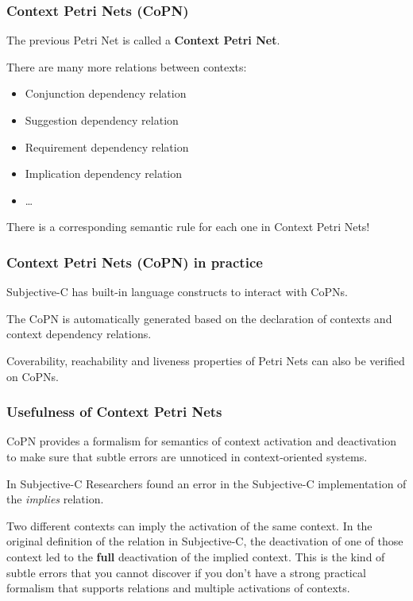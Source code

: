 \documentclass{beamer}
\begin{document}












\begin{frame}
	\frametitle{Context Petri Nets (CoPN)}

	The previous Petri Net is called a \textbf{Context Petri Net}.
	\bigskip

	There are many more relations between contexts:

	\begin{itemize}
		\item Conjunction dependency relation
		\item Suggestion dependency relation
		\item Requirement dependency relation
		\item Implication dependency relation
		\item \ldots
	\end{itemize}

	There is a corresponding semantic rule for each one in Context Petri Nets!

\end{frame}

\begin{frame}
	\frametitle{Context Petri Nets (CoPN) in practice}

	Subjective-C has built-in language constructs to interact with CoPNs.
	\bigskip

	The CoPN is automatically generated based on the declaration of contexts and
	context dependency relations.
	\bigskip

	Coverability, reachability and liveness properties of Petri Nets can also
	be verified on CoPNs.
\end{frame}

\begin{frame}
	\frametitle{Usefulness of Context Petri Nets}

	CoPN provides a formalism for semantics of context activation and deactivation
	to make sure that subtle errors are unnoticed in context-oriented systems.

	\begin{exampleblock}{In Subjective-C}
		Researchers found an error in the Subjective-C implementation of the
		\textit{implies} relation.\newline

		Two different contexts can imply the activation of the same context. In the
		original definition of the relation in Subjective-C, the deactivation
		of one of those context led to the \textbf{full} deactivation of the
		implied context. This is the kind of subtle errors that you cannot discover if
		you don't have a strong practical formalism that supports relations and multiple
		activations of contexts.
	\end{exampleblock}
\end{frame}
\end{document}
